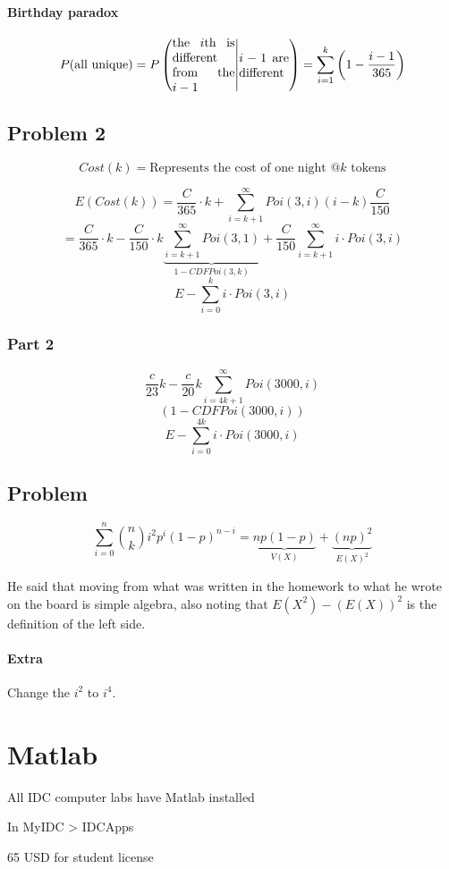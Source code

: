 \documentclass[a4paper]{article}
\newenvironment{itemize*}%
  {\begin{itemize}%
    \setlength{\itemsep}{0pt}%
    \setlength{\parsep}{0pt}%
    \setlength{\parskip}{0pt}}%
  {\end{itemize}}
\begin{document}
\paragraph{Birthday paradox}
\[
P(\text{all unique}) =
P\left(
  \parbox{5em}{the $i$th is different from the $i-1$} \middle|
  \parbox{4em}{$i-1$ are different}
\right)=
\sum_{i=1}^{k} \left(1-\frac{i-1}{365}\right)
\]

\subsection{Problem 2}

\[Cost(k)=\text{Represents the cost of one night @$k$ tokens}\]

\[
E(Cost(k))=\frac{C}{365}\cdot k + \sum_{i=k+1}^{\infty} Poi(3,i)(i-k)\frac{C}{150}
\]
\[=\frac{C}{365}\cdot k-\frac{C}{150}\cdot k \underbrace{\sum_{i=k+1}^{\infty} Poi(3,1)}_{1-CDFPoi(3,k)} + \frac{C}{150}\sum_{i=k+1}^{\infty} i \cdot Poi(3,i)\]
\[E-\sum_{i=0}^{k}i\cdot Poi(3,i)\]

\subsubsection{Part 2}
\[\frac{c}{23} k - \frac{c}{20} k \sum_{i=4k+1}^{\infty} Poi(3000, i)\]
\[(1-CDFPoi(3000,i))\]
\[E-\sum_{i=0}^{4k}i\cdot Poi(3000, i)\]

\subsection{Problem}

\[\sum_{i=0}^{n} \binom{n}{k} i^2 p^i (1-p)^{n-i}=\underbrace{np(1-p)}_{V(X)}+\underbrace{(np)^2}_{E(X)^2}\]

He said that moving from what was written in the homework to what he wrote on the board is simple algebra, also noting that $E(X^2)-(E(X))^2$ is the definition of the left side.

\paragraph{Extra}
Change the $i^2$ to $i^4$.

\section{Matlab}

\begin{itemize*}
  \item All IDC computer labs have Matlab installed
  \item In MyIDC > IDCApps
  \item 65 USD for student license
\end{itemize*}
\end{document}
